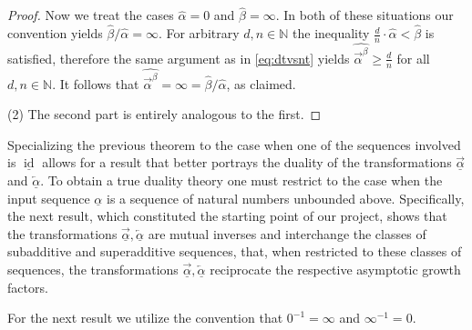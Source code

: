 \documentclass[12pt, reqno]{amsart}
\numberwithin{equation}{section}
\def\a{\ensuremath{\alpha}}
\def\ua{\ensuremath{\underline{\alpha}}}
\def\b{\ensuremath{\beta}}
\def\ub{\ensuremath{\underline{\beta}}}
\def\e{\ensuremath{\varepsilon}}
\newcommand{\wa}{\widehat{\alpha}}
\newcommand{\wb}{\widehat{\beta}}
\newcommand{\N}{{\mathbb N}}
\def\id{{\operatorname{id}}}
\theoremstyle{plain} %
\theoremstyle{definition}
\theoremstyle{remark}
\newcommand{\uao}{\overleftarrow{\ua}}
\newcommand{\uau}{\overrightarrow{\ua}}
\newcommand{\au}{\overrightarrow{\alpha}}
\begin{document}
\begin{proof}
Now we treat the cases $\wa=0$ and $\wb=\infty$. In both of these situations our convention yields $\wb/\wa=\infty$. For arbitrary $d,n\in \N$ the inequality $\frac{d}{n} \cdot \wa<{\wb}$ is satisfied, therefore the same argument as in \eqref{eq:dtvsnt} yields $\widehat{\au^\b}\geq \frac{d}{n}$ for all $d,n\in \N$. It follows that $\widehat{\au^\b}=\infty=\wb/\wa$, as claimed.

%
%
 

(2) The second part is entirely analogous to the first.
\end{proof}

Specializing the previous theorem to the case when one of the sequences involved is $\underline{\id}$ allows for a result that better portrays the duality of the transformations $\uau$ and $\uao$.  To obtain a true duality theory one must restrict to the case when the input sequence $\ua$ is  a sequence of natural numbers unbounded above. Specifically, the next result, which constituted the starting point of our project, shows that the transformations $\uau, \uao$ are mutual inverses and  interchange the classes of subadditive and superadditive sequences, that, when restricted to these classes of sequences, the transformations $\uau, \uao$ reciprocate the respective asymptotic growth factors. 

 
 For the next result we utilize the convention that $0^{-1}=\infty$ and $\infty^{-1}=0$.
\end{document}
